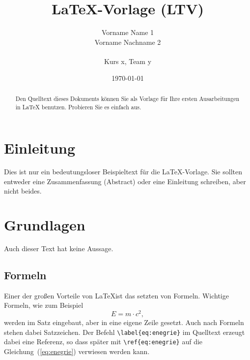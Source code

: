 \documentclass[11pt,a4paper]{article}
\begin{document}
\title{\LaTeX-Vorlage (LTV)}
\author{Vorname Name 1 \\
        Vorname Nachname 2\\ \\
        Kurs x, Team y}
\date{\today}
\maketitle

\tableofcontents


\clearpage
\begin{abstract}
    Den Quelltext dieses Dokuments können Sie als Vorlage für Ihre ersten Ausarbeitungen in LaTeX benutzen. Probieren Sie es einfach aus.
\end{abstract}

\section{Einleitung}
Dies ist nur ein bedeutungsloser Beispieltext für die \LaTeX-Vorlage.
Sie sollten entweder eine Zusammenfassung (Abstract) oder eine Einleitung schreiben, aber nicht beides.
\section{Grundlagen}
Auch dieser Text hat keine Aussage.
\subsection{Formeln}
Einer der großen Vorteile von \LaTeX ist das setzten von Formeln. Wichtige Formeln, wie zum Beispiel
\begin{equation}
    E = m\cdot c^2,
    \label{eq:enegrie}
\end{equation}
werden im Satz eingebaut, aber in eine eigene Zeile gesetzt. Auch nach Formeln stehen dabei Satzzeichen. Der Befehl \verb!\label{eq:enegrie}! im Quelltext erzeugt dabei eine Referenz, so dass später mit \verb!\ref{eq:enegrie}! auf die Gleichung~(\ref{eq:enegrie}) verwiesen werden kann. %
\end{document}
